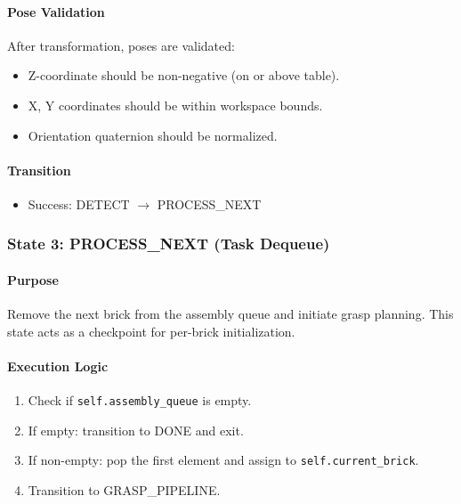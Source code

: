 \paragraph{Pose Validation}

After transformation, poses are validated:
\begin{itemize}
    \item Z-coordinate should be non-negative (on or above table).
    \item X, Y coordinates should be within workspace bounds.
    \item Orientation quaternion should be normalized.
\end{itemize}

\paragraph{Transition}

\begin{itemize}
    \item Success: DETECT $\rightarrow$ PROCESS\_NEXT
\end{itemize}

\subsubsection{State 3: PROCESS\_NEXT (Task Dequeue)}
\label{state:processnext}

\paragraph{Purpose}

Remove the next brick from the assembly queue and initiate grasp planning. This state acts as a checkpoint for per-brick initialization.

\paragraph{Execution Logic}

\begin{enumerate}
    \item Check if \texttt{self.assembly\_queue} is empty.
    \item If empty: transition to DONE and exit.
    \item If non-empty: pop the first element and assign to \texttt{self.current\_brick}.
    \item Transition to GRASP\_PIPELINE.
\end{enumerate}

